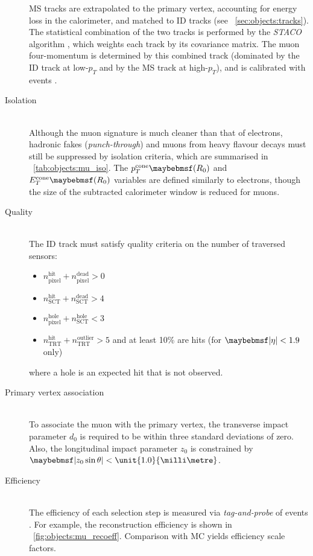 \begin{description}
	\ac{MS} tracks are extrapolated to the primary vertex, accounting for energy loss in 
	the calorimeter, and matched to \ac{ID} tracks (see 
	\Section~\ref{sec:objects:tracks}). The statistical combination of the two 
	tracks is performed by the \textit{STACO} algorithm \cite{Muons:algorithms}, which
	weights each track by its covariance matrix. The muon four-momentum is determined 
	by this combined track (dominated by the \ac{ID} track at low-$p_T$ and by the 
	\ac{MS} track at high-$p_T$), and is calibrated with \HepProcess{\PZ \HepTo \Pmu\Pmu}
	events \cite{Muons:2012}.
\item[Isolation] \hfill \\
	Although the muon signature is much cleaner than that of electrons, hadronic fakes 
	(\textit{punch-through}) and muons from heavy flavour decays must still be suppressed 
	by isolation criteria, which are summarised in \Table~\ref{tab:objects:mu_iso}. The 
	$p_T^{\text{cone}}\parenths{R_0}$ and $E_T^{\text{cone}}\parenths{R_0}$ variables are 
	defined similarly to electrons, though the size of the subtracted calorimeter window 
	is reduced for muons.
\item[Quality] \hfill \\
	The \ac{ID} track must satisfy quality criteria on the number of traversed sensors:
	\begin{itemize}[noitemsep,nolistsep]
		\item $n_{\text{pixel}}^{\text{hit}} + n_{\text{pixel}}^{\text{dead}} > 0$
		\item $n_{\text{SCT}}^{\text{hit}} + n_{\text{SCT}}^{\text{dead}} > 4$
		\item $n_{\text{pixel}}^{\text{hole}} + n_{\text{SCT}}^{\text{hole}} < 3$
		\item $n_{\text{TRT}}^{\text{hit}} + n_{\text{TRT}}^{\text{outlier}} > 5$ and at 
		least 10\% are hits (for $\mods{\eta} < 1.9$ only)
	\end{itemize}
	where a hole is an expected hit that is not observed.
\item[Primary vertex association] \hfill \\
	To associate the muon with the primary vertex, the transverse impact parameter $d_0$ 
	is required to be within three standard deviations of zero. Also, the longitudinal 
	impact parameter $z_0$ is constrained by $\mods{z_0 \sin\theta} < 
	\unit{1.0}{\milli\metre}$.
\item[Efficiency] \hfill \\
	The efficiency of each selection step is measured via \textit{tag-and-probe} of 
	\HepProcess{\PZ \HepTo \Pmu\Pmu} events \cite{Muons:2012}. For example, the 
	reconstruction efficiency is shown in \Figure~\ref{fig:objects:mu_recoeff}. 
	Comparison with MC yields efficiency scale factors.
\end{description}

